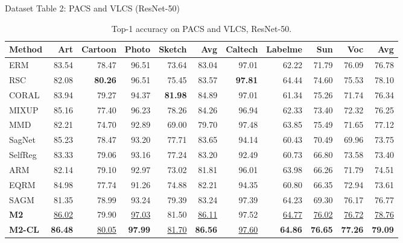 \documentclass[t, aspectratio=169]{beamer} %
\begin{document}
	\begin{frame}{Dataset Table 2: PACS and VLCS (ResNet-50)}
\begin{table}[htbp]
\centering
\caption{Top-1 accuracy on PACS and VLCS, ResNet-50.}
\scriptsize
\begin{adjustbox}{max width=\textwidth}
\begin{tabular}{lrrrrrrrrrr}
\toprule
Method & Art & Cartoon & Photo & Sketch & Avg & Caltech & Labelme & Sun & Voc & Avg \\
\midrule
ERM & 83.54 & 78.47 & 96.51 & 73.64 & 83.04 & 97.01 & 62.22 & 71.79 & 76.09 & 76.78 \\
RSC & 82.08 & \textbf{80.26} & 96.51 & 75.45 & 83.57 & \textbf{97.81} & 64.44 & 74.60 & 75.53 & 78.10 \\
CORAL & 83.94 & 79.27 & 94.37 & \textbf{81.98} & 84.89 & 97.01 & 61.34 & 75.26 & 71.74 & 76.34 \\
MIXUP & 85.16 & 77.40 & 96.23 & 78.26 & 84.26 & 96.94 & 62.33 & 73.40 & 72.32 & 76.25 \\
MMD & 82.21 & 74.70 & 92.89 & 69.00 & 79.70 & 97.48 & 63.85 & 75.49 & 71.65 & 77.12 \\
SagNet & 85.23 & 78.47 & 93.20 & 77.71 & 83.65 & 94.14 & 60.43 & 70.49 & 69.96 & 73.75 \\
SelfReg & 83.33 & 79.06 & 93.16 & 77.24 & 83.20 & 92.49 & 60.73 & 66.80 & 73.58 & 73.40 \\
ARM & 82.14 & 79.10 & 92.97 & 73.02 & 81.81 & 96.01 & 63.98 & 66.26 & 71.79 & 74.51 \\
EQRM & 84.98 & 77.74 & 91.26 & 74.88 & 82.21 & 94.35 & 60.80 & 66.35 & 72.94 & 73.61 \\
SAGM & 81.35 & 78.99 & 93.24 & 79.39 & 83.24 & 97.39 & 64.23 & 69.30 & 76.17 & 76.77 \\
\midrule
\textbf{M2} & \underline{86.02} & 79.90 & \underline{97.03} & 81.50 & \underline{86.11} & 97.52 & \underline{64.77} & \underline{76.02} & \underline{76.72} & \underline{78.76} \\
\textbf{M2-CL} & \textbf{86.48} & \underline{80.05} & \textbf{97.99} & \underline{81.70} & \textbf{86.56} & \underline{97.60} & \textbf{64.86} & \textbf{76.65} & \textbf{77.26} & \textbf{79.09} \\
\bottomrule
\end{tabular}
\end{adjustbox}
\end{table}
	\end{frame}
\end{document}
